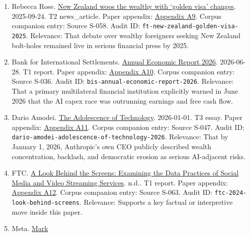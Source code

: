 \documentclass[
  american,
  11pt,
  letterpaper,
]{article}
\begin{document}
\begin{enumerate}
  \texttt{guardian-billionaires-new-zealand-2018}. Relevance: That by
  February 15, 2018 New Zealand had already become a recognizable
  elite-safe-haven trope in public collapse-prep discourse around
  Silicon Valley.
\item
  Rebecca Rose.
  \href{https://www.ft.com/content/76ca455c-3b16-4413-8738-3f17431d125b}{New
  Zealand woos the wealthy with `golden visa' changes}. 2025-09-24. T2
  news\_article. Paper appendix:
  \hyperref[appendix-a9-new-zealand-woos-the-wealthy-with-golden-visa-changes]{Appendix
  A9}. Corpus companion entry: Source S-058. Audit ID:
  \texttt{ft-new-zealand-golden-visa-2025}. Relevance: That debate over
  wealthy foreigners seeking New Zealand bolt-holes remained live in
  serious financial press by 2025.
\item
  Bank for International Settlements.
  \href{https://www.bis.org/publ/arpdf/ar2026e.pdf}{Annual Economic
  Report 2026}. 2026-06-28. T1 report. Paper appendix:
  \hyperref[appendix-a10-annual-economic-report-2026]{Appendix A10}.
  Corpus companion entry: Source S-036. Audit ID:
  \texttt{bis-annual-economic-report-2026}. Relevance: That a primary
  multilateral financial institution explicitly warned in June 2026 that
  the AI capex race was outrunning earnings and free cash flow.
\item
  Dario Amodei.
  \href{https://darioamodei.com/essay/the-adolescence-of-technology}{The
  Adolescence of Technology}. 2026-01-01. T3 essay. Paper appendix:
  \hyperref[appendix-a11-the-adolescence-of-technology]{Appendix A11}.
  Corpus companion entry: Source S-047. Audit ID:
  \texttt{dario-amodei-adolescence-of-technology-2026}. Relevance: That
  by January 1, 2026, Anthropic's own CEO publicly described wealth
  concentration, backlash, and democratic erosion as serious AI-adjacent
  risks.
\item
  FTC.
  \href{https://www.ftc.gov/reports/look-behind-screens-examining-data-practices-social-media-video-streaming-services}{A
  Look Behind the Screens: Examining the Data Practices of Social Media
  and Video Streaming Services}. n.d.. T1 report. Paper appendix:
  \hyperref[appendix-a12-a-look-behind-the-screens-examining-the-data-practices-of-social-media-and-video-streaming-services]{Appendix
  A12}. Corpus companion entry: Source S-063. Audit ID:
  \texttt{ftc-2024-look-behind-screens}. Relevance: Supports a key
  factual or interpretive move inside this paper.
\item
  Meta.
  \href{https://about.fb.com/news/2023/03/mark-zuckerberg-meta-year-of-efficiency/}{Mark
}
\end{enumerate}
\end{document}
